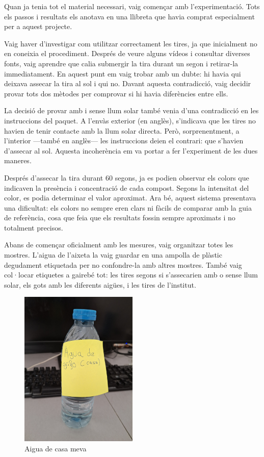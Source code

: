 Quan ja tenia tot el material necessari, vaig començar amb l’experimentació. Tots els passos i resultats els anotava en una llibreta que havia comprat especialment per a aquest projecte.

Vaig haver d’investigar com utilitzar correctament les tires, ja que inicialment no en coneixia el procediment. Després de veure alguns vídeos i consultar diverses fonts, vaig aprendre que calia submergir la tira durant un segon i retirar-la immediatament. En aquest punt em vaig trobar amb un dubte: hi havia qui deixava assecar la tira al sol i qui no. Davant aquesta contradicció, vaig decidir provar tots dos mètodes per comprovar si hi havia diferències entre ells.

La decisió de provar amb i sense llum solar també venia d’una contradicció en les instruccions del paquet. A l’envàs exterior (en anglès), s’indicava que les tires no havien de tenir contacte amb la llum solar directa. Però, sorprenentment, a l’interior —també en anglès— les instruccions deien el contrari: que s’havien d’assecar al sol. Aquesta incoherència em va portar a fer l’experiment de les dues maneres.

Després d’assecar la tira durant 60 segons, ja es podien observar els colors que indicaven la presència i concentració de cada compost. Segons la intensitat del color, es podia determinar el valor aproximat. Ara bé, aquest sistema presentava una dificultat: els colors no sempre eren clars ni fàcils de comparar amb la guia de referència, cosa que feia que els resultats fossin sempre aproximats i no totalment precisos.

Abans de començar oficialment amb les mesures, vaig organitzar totes les mostres. L’aigua de l’aixeta la vaig guardar en una ampolla de plàstic degudament etiquetada per no confondre-la amb altres mostres. També vaig col·locar etiquetes a gairebé tot: les tires segons si s’assecarien amb o sense llum solar, els gots amb les diferents aigües, i les tires de l’institut.
\begin{figure}[H]
\centering
\includegraphics[width=0.5\textwidth, angle=270]{./Figures/aguadecasa.png}
\caption{Aigua de casa meva}
\label{fig:foto}
\end{figure}

